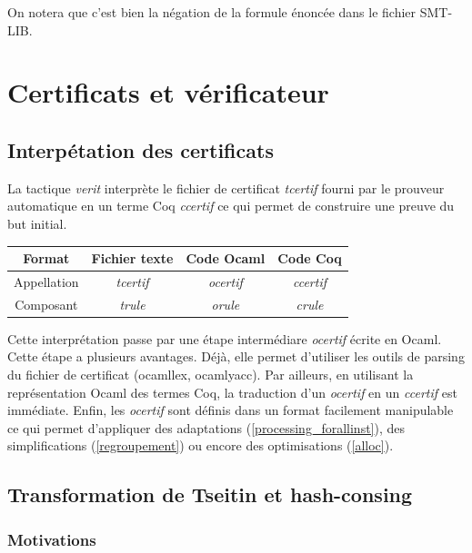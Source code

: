 \documentclass[11pt]{article}
\begin{document}
On notera que c'est bien la négation de la formule énoncée dans le fichier SMT-LIB. 


\newpage
\section{Certificats et vérificateur}

\subsection{Interpétation des certificats}

La tactique \textit{verit} interprète le fichier de certificat \textit{tcertif} fourni par le prouveur automatique en un terme Coq \textit{ccertif} ce qui permet de construire une preuve du but initial. \\

\begin{center}
\begin{tabular}{ |c||c|c|c| } 
 \hline
 Format & Fichier texte & Code Ocaml & Code Coq \\ 
 \hline
 Appellation & \textit{tcertif} & \textit{ocertif} & \textit{ccertif} \\ 
 \hline
 Composant & \textit{trule} & \textit{orule} & \textit{crule} \\ 
 \hline
\end{tabular}
\end{center}

Cette interprétation passe par une étape intermédiare \textit{ocertif} écrite en Ocaml. Cette étape a plusieurs avantages. Déjà, elle permet d'utiliser les outils de parsing du fichier de certificat (ocamllex, ocamlyacc). Par ailleurs, en utilisant la représentation Ocaml des termes Coq, la traduction d'un \textit{ocertif} en un \textit{ccertif} est immédiate. Enfin, les \textit{ocertif} sont définis dans un format facilement manipulable ce qui permet d'appliquer des adaptations (\ref{processing_forallinst}), des simplifications (\ref{regroupement}) ou encore des optimisations (\ref{alloc}).




\subsection{Transformation de Tseitin et hash-consing} \label{tseitin}

\subsubsection{Motivations}
\end{document}
